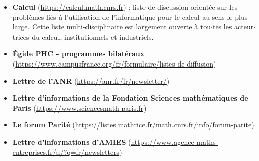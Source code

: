 \begin{itemize}[itemsep = 15pt]
\item {\bf Calcul} (\url{https://calcul.math.cnrs.fr}) : liste de discussion orient\'ee sur les
probl\`emes li\'es \`a l'utilisation de l'informatique pour le calcul au
sens le plus large. Cette liste multi-disciplinaire est largement
ouverte \`a tou$\cdot$tes les acteur$\cdot$trices du calcul, institutionnels et
industriels.

%
\item{\bf \'Egide PHC  - programmes bilat\'eraux } (\url{https://www.campusfrance.org/fr/formulaire/listes-de-diffusion})

\item{\bf Lettre de l'ANR} (\url{https://anr.fr/fr/newsletter/})


\item{\bf Lettre d'informations de la Fondation Sciences math\'ematiques de Paris} (\url{https://www.sciencesmath-paris.fr})

\item {\bf Le forum Parit\'e} (\url{https://listes.mathrice.fr/math.cnrs.fr/info/forum-parite})

\item{\bf Lettre d'informations d'AMIES} (\url{https://www.agence-maths-entreprises.fr/a/?q=fr/newsletters})

\end{itemize}
